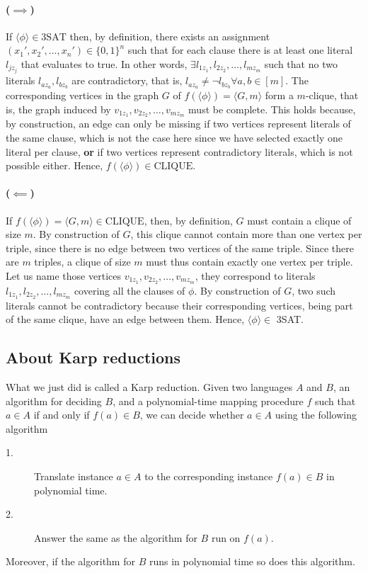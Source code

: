 \documentclass{article}
\makeatletter
\DeclareMathOperator{\Forall}{\forall}
\newenvironment{steps}%
{%
\vspace{0.25cm}%
\begin{adjustwidth}{0.3cm}{0cm}%
\begin{description}%
}
{%
\end{description}%
\end{adjustwidth}%
\vspace{0.1cm}%
}
\newcounter{TMachine}[section]
\newenvironment{TMachine}[1]
  {\refstepcounter{TMachine}%
   \par%
   \vspace{.5\baselineskip\@plus.2\baselineskip\@minus.2\baselineskip}%
   \noindent{#1}%
   \begin{steps}}%
  {\end{steps}%
\vspace{.5\baselineskip\@plus.2\baselineskip\@minus.2\baselineskip}%
}%
\makeatother
\begin{document}
\paragraph{(\(\implies\))} If \(\langle\phi\rangle \in \text{3SAT}\) then, by definition,
there exists an assignment \((x_1', x_2', \ldots, x_n') \in \{0,1\}^n\) such
that for each clause there is at least one literal \(l_{jz_j}\) that evaluates
to true. In other words, \(\exists l_{1z_1},l_{2z_2},\ldots,l_{mz_m}\) such
that no two literals \(l_{az_a},l_{bz_b}\) are contradictory, that is,
\(l_{az_a} \neq \lnot l_{bz_b} \Forall a,b \in [m]\). The corresponding
vertices in the graph \(G\) of \(f(\langle \phi \rangle) = \langle G,m
\rangle\)
form a \(m\)-clique, that
is, the graph induced by \(v_{1z_1},v_{2z_2},\ldots,v_{mz_m}\) must be
complete. This holds because, by construction, an edge can only be missing if two
vertices represent literals of the same clause, which is not the case here
since we have selected exactly one literal per clause, \textbf{or} if two
vertices represent contradictory literals, which is not
possible either. Hence, \(f(\langle \phi \rangle) \in \text{CLIQUE}\).

\paragraph{(\(\impliedby\))} If \(f(\langle \phi \rangle) = \langle G, m \rangle \in \text{CLIQUE}\),
then, by definition, \(G\) must contain a clique of size \(m\). By
construction of \(G\), this clique cannot contain more than one vertex per
triple, since there is no edge between two vertices of the same triple. Since
there are \(m\) triples, a clique of size \(m\) must thus contain exactly one
vertex per triple. Let us name those vertices
\(v_{1z_1},v_{2z_2},\ldots,v_{mz_m}\), they correspond to literals
\(l_{1z_1},l_{2z_2},\ldots,l_{mz_m}\) covering all the clauses of \(\phi\).
By construction of \(G\), two such literals cannot be contradictory because
their corresponding vertices, being part of the same clique, have an edge
between them. Hence, \(\langle \phi \rangle \in\) 3SAT.

\subsection{About Karp reductions}

What we just did is called a Karp reduction. Given two languages \(A\)
and \(B\), an algorithm for deciding \(B\), and a polynomial-time
mapping procedure \(f\) such that
\(a \in A\) if and only if \(f(a) \in B\), we can decide whether \(a \in A\) using
the following algorithm
\begin{TMachine}{On input \(a\):}
\item[1.] Translate instance \(a \in A\) to the corresponding instance \(f(a) \in
	B\) in polynomial time.
\item[2.] Answer the same as the algorithm for \(B\) run on \(f(a)\).
\end{TMachine}
Moreover, if the algorithm for \(B\) runs in polynomial time so does this
algorithm.
\end{document}
